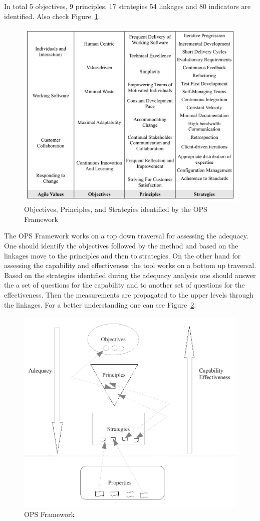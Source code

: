 In total 5 objectives, 9 principles, 17 strategies 54 linkages and 80 indicators are identified. Also check Figure~\ref{objectives_principles_strategies}.

\begin{figure} [H]
\centerline{\includegraphics[scale=0.75]{include/relatedwork/fig/ops.pdf}}
\caption{Objectives, Principles, and Strategies identified by the OPS Framework} 
\label{objectives_principles_strategies}
\end{figure} 

The OPS Framework works on a top down traversal for assessing the adequacy. One should identify the objectives followed by the method and based on the linkages move to the principles and then to strategies. On the other hand for assessing the capability and effectiveness the tool works on a bottom up traversal. Based on the strategies identified during the adequacy analysis one should answer the a set of questions for the capability and to another set of questions for the effectiveness. Then the measurements are propagated to the upper levels through the linkages. For a better understanding one can see Figure~\ref{ops_core}.

\begin{figure} [H]
\centerline{\includegraphics[scale=0.75]{include/relatedwork/fig/ops_core.pdf}}
\caption{OPS Framework} 
\label{ops_core}
\end{figure} 
